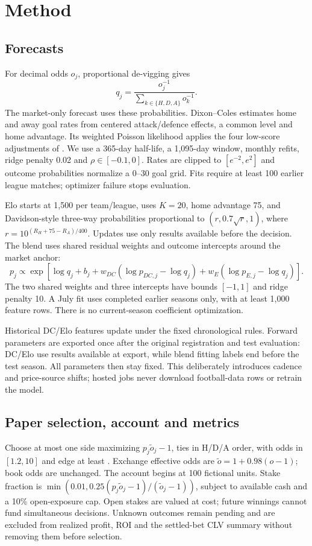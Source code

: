 \documentclass[11pt]{article}
\begin{document}
\section{Method}
\subsection{Forecasts}
For decimal odds $o_j$, proportional de-vigging gives
\begin{equation}
q_j=\frac{o_j^{-1}}{\sum_{k\in\{H,D,A\}}o_k^{-1}}.
\end{equation}
The market-only forecast uses these probabilities. Dixon--Coles estimates home and away
goal rates from centered attack/defence effects, a common level and home advantage.
Its weighted Poisson likelihood applies the four low-score adjustments of
\citet{dixon1997}. We use a 365-day half-life, a 1,095-day window, monthly refits, ridge
penalty 0.02 and $\rho\in[-0.1,0]$. Rates are clipped to $[e^{-2},e^2]$ and outcome
probabilities normalize a 0--30 goal grid. Fits require at least 100 earlier league matches;
optimizer failure stops evaluation.

Elo starts at 1,500 per team/league, uses $K=20$, home advantage 75, and Davidson-style
three-way probabilities proportional to $(r,0.7\sqrt r,1)$, where
$r=10^{(R_H+75-R_A)/400}$. Updates use only results available before the decision.
The blend uses shared residual weights and outcome intercepts around the market anchor:
\begin{equation}
p_j\propto \exp\!\left[\log q_j+b_j+
 w_{DC}(\log p_{DC,j}-\log q_j)+w_E(\log p_{E,j}-\log q_j)\right].
\end{equation}
The two shared weights and three intercepts have bounds $[-1,1]$ and ridge penalty 10.
A July fit uses completed earlier seasons only, with at least 1,000 feature rows.
There is no current-season coefficient optimization.

Historical DC/Elo features update under the fixed chronological rules. Forward parameters
are exported once after the original registration and test evaluation: DC/Elo use results
available at export, while blend fitting labels end before the test season. All parameters
then stay fixed. This deliberately introduces cadence and price-source shifts; hosted jobs
never download football-data rows or retrain the model.

\subsection{Paper selection, account and metrics}
Choose at most one side maximizing $p_j\tilde o_j-1$, ties in H/D/A order, with odds in
$[1.2,10]$ and edge at least \effectThreshold. Exchange effective odds are
$\tilde o=1+0.98(o-1)$; book odds are unchanged. The account begins at 100 fictional units.
Stake fraction is $\min(0.01,0.25(p_j\tilde o_j-1)/(\tilde o_j-1))$, subject to available
cash and a 10\% open-exposure cap. Open stakes are valued at cost; future winnings cannot
fund simultaneous decisions. Unknown outcomes remain pending and are excluded from
realized profit, ROI and the settled-bet CLV summary without removing them before selection.
\end{document}

